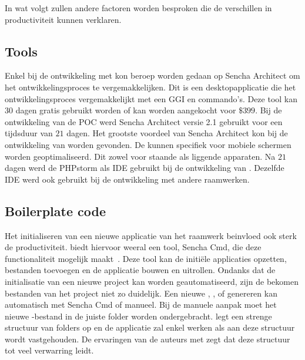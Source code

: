In wat volgt zullen andere factoren worden besproken die de verschillen in productiviteit kunnen verklaren.

\subsection{Tools}
Enkel bij de ontwikkeling met \st{} kon beroep worden gedaan op Sencha Architect om het ontwikkelingsproces te vergemakkelijken.
Dit is een desktopapplicatie die het ontwikkelingsproces vergemakkelijkt met een GGI en  commando's.  
Deze tool kan 30 dagen gratis gebruikt worden of kan worden aangekocht voor $\$399$.
Bij de ontwikkeling van de POC werd Sencha Architect versie 2.1 gebruikt voor een tijdsduur van $21$ dagen.
Het grootste voordeel van Sencha Architect kon bij de ontwikkeling van  worden gevonden.
De  kunnen specifiek voor mobiele schermen worden geoptimaliseerd.
Dit zowel voor staande als liggende apparaten.
Na $21$ dagen werd  de PHPstorm als IDE gebruikt bij de ontwikkeling van \st{}.
Dezelfde IDE werd ook gebruikt bij de ontwikkeling met andere raamwerken.

\subsection{Boilerplate code}
Het initialiseren van een nieuwe applicatie van het raamwerk beinvloed ook sterk de productiviteit.
\st{} biedt hiervoor weeral een tool,  Sencha Cmd,  die deze functionaliteit mogelijk maakt~\cite{Sencha2012}.
Deze tool kan de initiële applicaties opzetten,  bestanden toevoegen en de applicatie bouwen en uitrollen.
Ondanks dat de initialisatie van een nieuwe project kan worden geautomatiseerd, zijn de bekomen bestanden van het project niet zo duidelijk.
Een nieuwe ,  ,   of  genereren kan automatisch met Sencha Cmd of manueel.
Bij de manuele aanpak moet het nieuwe \js-bestand in de juiste folder worden ondergebracht.
\st{} legt een strenge structuur van folders op en de applicatie zal enkel werken als aan deze structuur wordt vastgehouden.
De ervaringen van de auteurs met \st{} zegt dat deze structuur tot veel verwarring leidt.

